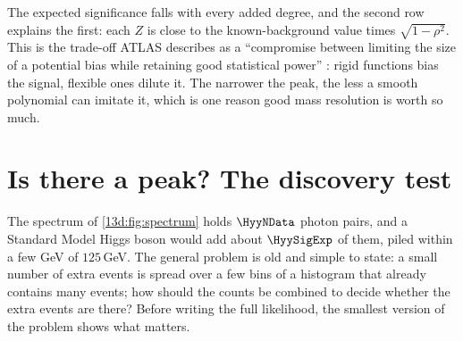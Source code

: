 The expected significance falls with every added degree, and the second row explains the
first: each $Z$ is close to the known-background value times $\sqrt{1-\rho^2}$. This is the
trade-off ATLAS describes as a ``compromise between limiting the size of a potential bias
while retaining good statistical power'' : rigid functions bias
the signal, flexible ones dilute it. The narrower the peak, the less a smooth polynomial can
imitate it, which is one reason good mass resolution is worth so much.
\section{Is there a peak? The discovery test}
\label{13d:sec:discovery}

The spectrum of \cref{13d:fig:spectrum} holds $\HyyNData$ photon pairs, and a Standard
Model Higgs boson would add about $\HyySigExp$ of them, piled within a few GeV of
$125\,$GeV. The general problem is old and simple to state: a small number of extra events
is spread over a few bins of a histogram that already contains many events; how should the
counts be combined to decide whether the extra events are there? Before writing the full
likelihood, the smallest version of the problem shows what matters.

